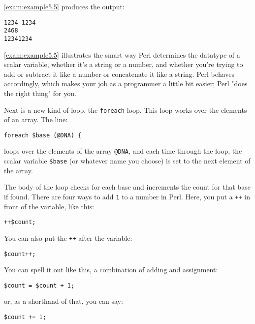 

\autoref{exam:example5.5} produces the output:

\begin{lstlisting}
1234 1234
2468
12341234
\end{lstlisting}

\autoref{exam:example5.5} illustrates the smart way Perl determines the datatype of a scalar variable, whether it's a string or a number, and whether you're trying to add or subtract it like a number or concatenate it like a string. Perl behaves accordingly, which makes your job as a programmer a little bit easier; Perl "does the right thing" for you.

Next is a new kind of loop, the \verb|foreach| loop. This loop works over the elements of an array. The line: 

\begin{lstlisting}
foreach $base (@DNA) {
\end{lstlisting}

loops over the elements of the array \verb|@DNA|, and each time through the loop, the scalar variable \verb|$base| (or whatever name you choose) is set to the next element of the array.

The body of the loop checks for each base and increments the count for that base if found. There are four ways to add \verb|1| to a number in Perl.  Here, you put a \verb|++| in front of the variable, like this:

\begin{lstlisting}
++$count; 
\end{lstlisting}

You can also put the \verb|++| after the variable:

\begin{lstlisting}
$count++;
\end{lstlisting}

You can spell it out like this, a combination of adding and assignment:

\begin{lstlisting}
$count = $count + 1;
\end{lstlisting}

or, as a shorthand of that, you can say:

\begin{lstlisting}
$count += 1;
\end{lstlisting}

